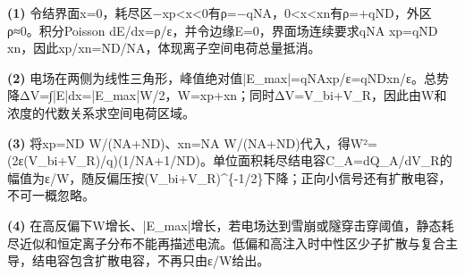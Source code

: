 \par\noindent\textbf{(1)} 令结界面x=0，耗尽区−xp<x<0有ρ=−qNA，0<x<xn有ρ=+qND，外区ρ≈0。积分Poisson dE/dx=ρ/ε，并令边缘E=0，界面场连续要求qNA xp=qND xn，因此xp/xn=ND/NA，体现离子空间电荷总量抵消。
\par\noindent\textbf{(2)} 电场在两侧为线性三角形，峰值绝对值|E\_max|=qNAxp/ε=qNDxn/ε。总势降ΔV=∫|E|dx=|E\_max|W/2，W=xp+xn；同时ΔV=V\_bi+V\_R，因此由W和浓度的代数关系求空间电荷区域。
\par\noindent\textbf{(3)} 将xp=ND W/(NA+ND)、xn=NA W/(NA+ND)代入，得W²=(2ε(V\_bi+V\_R)/q)(1/NA+1/ND)。单位面积耗尽结电容C\_A=dQ\_A/dV\_R的幅值为ε/W，随反偏压按(V\_bi+V\_R)\textasciicircum{}\{-1/2\}下降；正向小信号还有扩散电容，不可一概忽略。
\par\noindent\textbf{(4)} 在高反偏下W增长、|E\_max|增长，若电场达到雪崩或隧穿击穿阈值，静态耗尽近似和恒定离子分布不能再描述电流。低偏和高注入时中性区少子扩散与复合主导，结电容包含扩散电容，不再只由ε/W给出。
